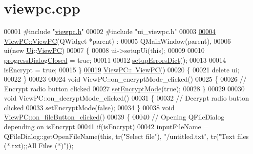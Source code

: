 \hypertarget{viewpc_8cpp_source}{}\section{viewpc.\+cpp}
\label{viewpc_8cpp_source}

\begin{DoxyCode}
00001 \textcolor{preprocessor}{#include "\hyperlink{viewpc_8h}{viewpc.h}"}
00002 \textcolor{preprocessor}{#include "ui\_viewpc.h"}
00003 
\hypertarget{viewpc_8cpp_source.tex_l00004}{}\hyperlink{class_view_p_c_a33c96c61f61042319c66c19059836b7f}{00004} \hyperlink{class_view_p_c_a33c96c61f61042319c66c19059836b7f}{ViewPC::ViewPC}(QWidget *parent) :
00005     QMainWindow(parent),
00006     ui(new \hyperlink{namespace_ui}{Ui}::\hyperlink{class_view_p_c}{ViewPC})
00007 \{
00008     ui->setupUi(\textcolor{keyword}{this});
00009 
00010     \hyperlink{class_view_p_c_add8c82aa2b0b934212aa5bde9277ab36}{progressDialogClosed} = \textcolor{keyword}{true};
00011 
00012     \hyperlink{class_view_p_c_a89236a0bb8760f02e984b85a8571934c}{setupErrorsDict}();
00013 
00014     isEncrypt = \textcolor{keyword}{true};
00015 \}
\hypertarget{viewpc_8cpp_source.tex_l00019}{}\hyperlink{class_view_p_c_a91c51f5c1e6ed5ab12b410339f469b0f}{00019} \hyperlink{class_view_p_c_a91c51f5c1e6ed5ab12b410339f469b0f}{ViewPC::~ViewPC}()
00020 \{
00021     \textcolor{keyword}{delete} ui;
00022 \}
00023 
00024 \textcolor{keywordtype}{void} ViewPC::on\_encryptMode\_clicked()
00025 \{
00026     \textcolor{comment}{// Encrypt radio button clicked}
00027     \hyperlink{class_view_p_c_a5b48951efefdc0e3039c9a4bf185320b}{setEncryptMode}(\textcolor{keyword}{true});
00028 \}
00029 
00030 \textcolor{keywordtype}{void} ViewPC::on\_decryptMode\_clicked()
00031 \{
00032     \textcolor{comment}{// Decrypt radio button clicked}
00033     \hyperlink{class_view_p_c_a5b48951efefdc0e3039c9a4bf185320b}{setEncryptMode}(\textcolor{keyword}{false});
00034 \}
\hypertarget{viewpc_8cpp_source.tex_l00038}{}\hyperlink{class_view_p_c_a3b9b7a7be9702d8b160f257f1c74a776}{00038} \textcolor{keywordtype}{void} \hyperlink{class_view_p_c_a3b9b7a7be9702d8b160f257f1c74a776}{ViewPC::on\_fileButton\_clicked}()
00039 \{
00040     \textcolor{comment}{// Opening QFileDialog depending on isEncrypt}
00041     \textcolor{keywordflow}{if}(isEncrypt)
00042         inputFileName = QFileDialog::getOpenFileName(\textcolor{keyword}{this}, tr(\textcolor{stringliteral}{"Select file"}), \textcolor{stringliteral}{"/untitled.txt"}, tr(\textcolor{stringliteral}{"Text
       files (*.txt);;All Files (*)"}));

\end{DoxyCode}

